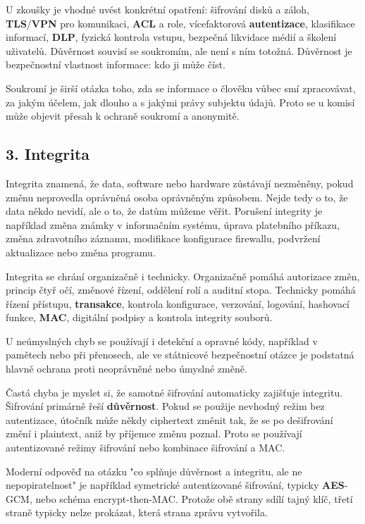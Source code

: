 U zkoušky je vhodné uvést konkrétní opatření: šifrování disků a záloh, \textbf{TLS}/\textbf{VPN} pro komunikaci, \textbf{ACL} a role, vícefaktorová \textbf{autentizace}, klasifikace informací, \textbf{DLP}, fyzická kontrola vstupu, bezpečná likvidace médií a školení uživatelů. Důvěrnost souvisí se soukromím, ale není s ním totožná. Důvěrnost je bezpečnostní vlastnost informace: kdo ji může číst.

Soukromí je širší otázka toho, zda se informace o člověku vůbec smí zpracovávat, za jakým účelem, jak dlouho a s jakými právy subjektu údajů. Proto se u komisí může objevit přesah k ochraně soukromí a anonymitě.

\subsection*{3. Integrita}

Integrita znamená, že data, software nebo hardware zůstávají nezměněny, pokud změnu neprovedla oprávněná osoba oprávněným způsobem. Nejde tedy o to, že data někdo nevidí, ale o to, že datům můžeme věřit. Porušení integrity je například změna známky v informačním systému, úprava platebního příkazu, změna zdravotního záznamu, modifikace konfigurace firewallu, podvržení aktualizace nebo změna programu.

Integrita se chrání organizačně i technicky. Organizačně pomáhá autorizace změn, princip čtyř očí, změnové řízení, oddělení rolí a auditní stopa. Technicky pomáhá řízení přístupu, \textbf{transakce}, kontrola konfigurace, verzování, logování, hashovací funkce, \textbf{MAC}, digitální podpisy a kontrola integrity souborů.

U neúmyslných chyb se používají i detekční a opravné kódy, například v pamětech nebo při přenosech, ale ve státnicové bezpečnostní otázce je podstatná hlavně ochrana proti neoprávněné nebo úmyslné změně.

Častá chyba je myslet si, že samotné šifrování automaticky zajišťuje integritu. Šifrování primárně řeší \textbf{důvěrnost}. Pokud se použije nevhodný režim bez autentizace, útočník může někdy ciphertext změnit tak, že se po dešifrování změní i plaintext, aniž by příjemce změnu poznal. Proto se používají autentizované režimy šifrování nebo kombinace šifrování a MAC.

Moderní odpověď na otázku "co splňuje důvěrnost a integritu, ale ne nepopiratelnost" je například symetrické autentizované šifrování, typicky \textbf{AES}-GCM, nebo schéma encrypt-then-MAC. Protože obě strany sdílí tajný klíč, třetí straně typicky nelze prokázat, která strana zprávu vytvořila.

